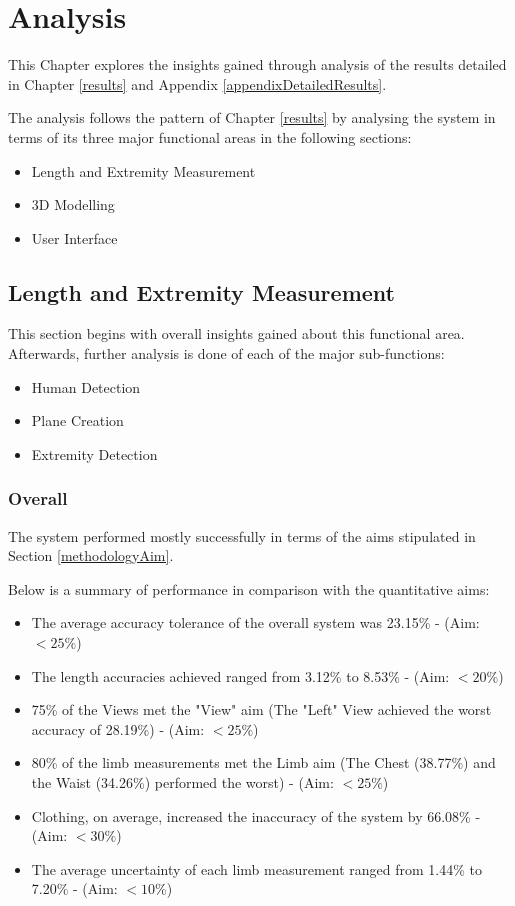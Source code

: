 \chapter{Analysis} \label{analysis}

This Chapter explores the insights gained through analysis of the results detailed in Chapter \ref{results} and Appendix \ref{appendixDetailedResults}.

The analysis follows the pattern of Chapter \ref{results} by analysing the system in terms of its three major functional areas in the following sections:

\begin{itemize}
	\item Length and Extremity Measurement
	\item 3D Modelling
	\item User Interface
\end{itemize} 

\section{Length and Extremity Measurement}
This section begins with overall insights gained about this functional area. Afterwards, further analysis is done of each of the major sub-functions:

\begin{itemize}
	\item Human Detection
	\item Plane Creation
	\item Extremity Detection
\end{itemize}

\subsection{Overall}
The system performed mostly successfully in terms of the aims stipulated in Section \ref{methodologyAim}. 

Below is a summary of performance in comparison with the quantitative aims:

\begin{itemize}
	\item The average accuracy tolerance of the overall system was 23.15\% - (Aim: $<25\%$)
	\item The length accuracies achieved ranged from 3.12\% to 8.53\% - (Aim: $<20\%$)
	\item 75\% of the Views met the "View" aim (The "Left" View achieved the worst accuracy of 28.19\%) - (Aim: $<25\%$)
	\item 80\% of the limb measurements met the Limb aim (The Chest (38.77\%) and the Waist (34.26\%) performed the worst) - (Aim: $<25\%$)
	\item Clothing, on average, increased the inaccuracy of the system by 66.08\% - (Aim: $<30\%$)
	\item The average uncertainty of each limb measurement ranged from 1.44\% to 7.20\% - (Aim: $<10\%$)
\end{itemize}

